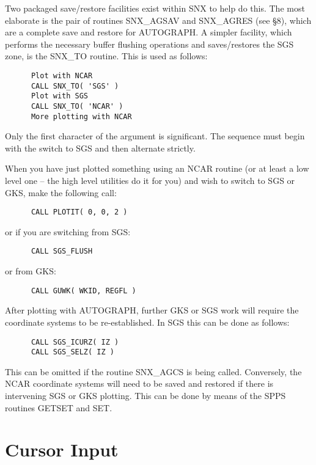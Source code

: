Two packaged save/restore facilities exist within SNX to help
do this.
The most elaborate is the pair of routines SNX\_AGSAV and SNX\_AGRES
(see \S 8), which are a complete save and restore for AUTOGRAPH.
A simpler facility, which performs the
necessary buffer flushing operations and saves/restores the
SGS zone, is the SNX\_TO routine.
This is used as follows:

\begin{verbatim}
      Plot with NCAR
      CALL SNX_TO( 'SGS' )
      Plot with SGS
      CALL SNX_TO( 'NCAR' )
      More plotting with NCAR
\end{verbatim}

Only the first character of the argument is significant.
The sequence must begin with the switch to SGS and then alternate strictly.

When you have just plotted something using an NCAR
routine (or at least a low level one -- the high level utilities do it
for you) and wish to switch to SGS or GKS, make the following call:

\begin{verbatim}
      CALL PLOTIT( 0, 0, 2 )
\end{verbatim}

or if you are switching from SGS:

\begin{verbatim}
      CALL SGS_FLUSH
\end{verbatim}

or from GKS:

\begin{verbatim}
      CALL GUWK( WKID, REGFL )
\end{verbatim}

After plotting with AUTOGRAPH, further GKS or SGS work will
require the coordinate systems to be re-established.
In SGS this can be done as follows:

\begin{verbatim}
      CALL SGS_ICURZ( IZ )
      CALL SGS_SELZ( IZ )
\end{verbatim}

This can be omitted if the routine SNX\_AGCS is being called.
Conversely, the NCAR coordinate systems will need to be saved and
restored if there is intervening SGS or GKS plotting.
This can be done by means of the SPPS routines
GETSET and SET.


\section {Cursor Input}

